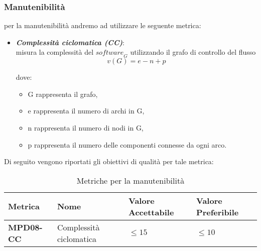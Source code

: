 \subsubsection{Manutenibilità}
per la manutenibilità andremo ad utilizzare le seguente metrica:
\begin{itemize}
    \item \textbf{\emph{Complessità ciclomatica (CC)}}:\\
    misura la complessità del $\textit{software}_G$ utilizzando il grafo di controllo del flusso
    \[
    v(G) = e - n + p
    \]

    dove:
    \begin{itemize}
        \item \(\text{G}\) rappresenta il grafo,
        \item \(\text{e}\) rappresenta il numero di archi in G,
        \item \(\text{n}\) rappresenta il numero di nodi in G,
        \item \(\text{p}\) rappresenta il numero delle componenti connesse da ogni arco.
    \end{itemize}
\end{itemize}
Di seguito vengono riportati gli obiettivi di qualità per tale metrica:
\begin{table}[htbp]
    \centering
    \begin{tabular}{|>{\centering\arraybackslash}p{4cm}|p{4cm}|p{4cm}|p{4cm}|}
    \hline
    \rowcolor{gray!30}
    \textbf{Metrica} & \textbf{Nome} & \textbf{Valore Accettabile} & \textbf{Valore Preferibile} \\
    \hline
    \rowcolor{gray!10}
    \textbf{MPD08-CC} & Complessità ciclomatica & $\leq 15 $ & $\leq 10$ \\
    \hline
    \end{tabular}
    \caption{Metriche per la manutenibilità}
    \label{tab:metriche_manutebilita}
\end{table}
\newpage
